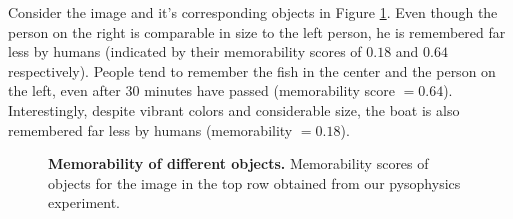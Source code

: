 Consider the image and it's corresponding objects in Figure \ref{fig:introPhoto}. Even though the person on the right is comparable in size to the left person, he is remembered far less by humans (indicated by their memorability scores of $0.18$ and $0.64$ respectively). People tend to remember the fish in the center and the person on the left, even after $30$ minutes have passed (memorability score $= 0.64$). Interestingly, despite vibrant colors and considerable size, the boat is also remembered far less by humans (memorability $= 0.18$).


\begin{figure}[t]
\centering
{}

\vspace{-3mm}

\vspace{-5mm}\caption{\footnotesize\textbf{Memorability of different objects.} Memorability scores of objects for the image in the top row obtained from our pysophysics experiment. }\label{fig:introPhoto}
\end{figure}

